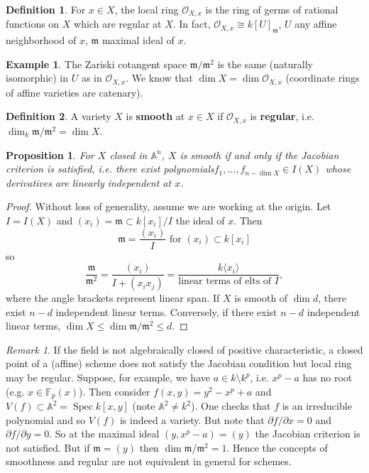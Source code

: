 \documentclass{article}
\newcommand{\F}{\mathbb{F}}
\newcommand{\fr}{\mathfrak}
\newcommand{\A}{\mathbb{A}}
\DeclareMathOperator{\Spec}{Spec}
\theoremstyle{plain}
\newtheorem{prop}[thm]{Proposition}
\theoremstyle{definition}
\newtheorem{defn}{Definition}
\newtheorem{exmp}{Example}
\theoremstyle{remark}
\newtheorem*{rem}{Remark}
\begin{document}
\begin{defn}
    For $x\in X$, the local ring $\mathcal{O}_{X,x}$ is the ring of 
    germs of rational functions on $X$ which are regular at $X$.
    In fact, $\mathcal{O}_{X,x}\cong k[U]_{\fr m}$, $U$ any affine neighborhood
    of $x$, $\fr m$ maximal ideal of $x$.
\end{defn}

\begin{exmp}
    The Zariski cotangent space $\fr m/\fr m^2$ is the same (naturally isomorphic)
    in $U$ as in $\mathcal{O}_{X,x}$. We know that $\dim X=\dim \mathcal{O}_{X,x}$
    (coordinate rings of affine varieties are catenary).
\end{exmp}

\begin{defn}
    A variety $X$ is \textbf{smooth} at $x\in X$ if $\mathcal{O}_{X,x}$ is
    \textbf{regular}, i.e. $\dim_k\fr m/\fr m^2=\dim X$.
\end{defn}

\begin{prop}
    For $X$ closed in $\A^n$, $X$ is smooth if and only if the Jacobian
    criterion is satisfied, i.e. there exist polynomials$f_1,\ldots,f_{n-\dim X}\in I(X)$
    whose derivatives are linearly independent at $x$.
\end{prop}
\begin{proof}
    Without loss of generality, assume we are working at the origin. Let $I=I(X)$ and
    $(x_i)=\fr m\subset k[x_i]/I$ the ideal of $x$. Then
    \[\fr m=\frac{(x_i)}{I} \text{ for }(x_i)\subset k[x_i]\]
    so
    \[\frac{\fr m}{\fr m^2}=\frac{(x_i)}{I+(x_ix_j)}=\frac{k\langle x_i\rangle}{\text{linear terms of elts of }I},\]
    where the angle brackets represent linear span. If $X$ is smooth of $\dim d$,
    there exist $n-d$ independent linear terms. Conversely, if there exist $n-d$ independent linear terms,
    $\dim X\leq \dim\fr m/\fr m^2\leq d$.
\end{proof}

\begin{rem}
    If the field is not algebraically closed of positive characteristic,
    a closed point of a (affine) scheme does not satisfy the Jacobian condition
    but local ring may be regular. Suppose, for example,
    we have $a\in k\setminus k^p$, i.e. $x^p-a$ has no root (e.g. $x\in\F_p(x)$).
    Then consider $f(x,y)=y^2-x^p+a$ and $V(f)\subset\A^2=\Spec k[x,y]$ (note $\A^2\neq k^2$).
    One checks that $f$ is an irreducible polynomial and so $V(f)$ is indeed a variety.
    But note that $\partial f/\partial x=0$ and $\partial f/\partial y=0$. So at
    the maximal ideal $(y,x^p-a)=(y)$ the Jacobian criterion is not satisfied.
    But if $\fr m=(y)$ then $\dim\fr m/\fr m^2=1$. Hence the concepts of smoothness
    and regular are not equivalent in general for schemes.
\end{rem}
\end{document}
